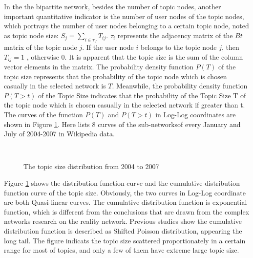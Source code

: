 \documentclass{elsarticle}
\begin{document}
In the the bipartite network, besides the number of topic
nodes, another important quantitative indicator is the number of user
nodes of the topic nodes, which portrays the number of user nodes
belonging to a certain  topic node, noted as topic node size: $S_j
= \sum_{i \in \tau_{J}}T_{ij}$. $\tau_i$  represents
the adjacency matrix of the $Bt$ matrix of the topic node $j$. If the user
node $i$ belongs to the topic node $j$, then $T_{ij}=1$ , otherwise 0. It is apparent that the topic size is the sum of the column vector
elements in the matrix. The probability density function $P(T)$  of
the topic size represents that the probability of the topic node which
is chosen casually in the selected network is $T$. Meanwhile, the
probability density function $P(T>t)$  of the Topic Size indicates
that the probability of the Topic Size T of the topic node which is
chosen casually in the selected network if greater than t. The curves
of the function $P(T)$  and  $P(T>t)$  in Log-Log coordinates are
shown in Figure \ref{fig:topic-size}.  Here lists 8 curves of the sub-networksof every
January and July of 2004-2007 in Wikipedia data.



\begin{figure}[htpb]
  \centering
  \subfigure[ ]{
     \scalebox{0.18}{\texttt{[image: 07-1]}}
   } \quad
  \subfigure[ ]{ 
       \scalebox{0.18}{\texttt{[image: 07-2]}}
   } 
   \
    \subfigure[ ]{
     \scalebox{0.18}{\texttt{[image: 07-3]}}
   } \quad
  \subfigure[ ]{ 
       \scalebox{0.18}{\texttt{[image: 07-4]}}
   } 
  

    \subfigure[ ]{
     \scalebox{0.18}{\texttt{[image: 07-5]}}
   } \quad
  \subfigure[ ]{ 
       \scalebox{0.18}{\texttt{[image: 07-6]}}
   } 

    \subfigure[ ]{
     \scalebox{0.18}{\texttt{[image: 07-7]}}
   } \quad
  \subfigure[ ]{ 
       \scalebox{0.18}{\texttt{[image: 07-8]}}
   } 
   \caption{The topic size distribution from 2004 to 2007}
   \label{fig:topic-size}
\end{figure}

Figure \ref{fig:topic-size} shows the distribution function curve and the cumulative
distribution function curve of the topic size. Obviously, the two
curves in Log-Log coordinate are both Quasi-linear curves. 
The cumulative distribution function is exponential function,
which is different from the conclusions that are drawn from the
complex networks research on the reality network. Previous studies show
the cumulative distribution function is described as Shifted Poisson
distribution, appearing the long tail. The figure indicats the topic
size scattered proportionately in a certain range for most of topics,
and only a few of them have extreme large topic size.
\end{document}

